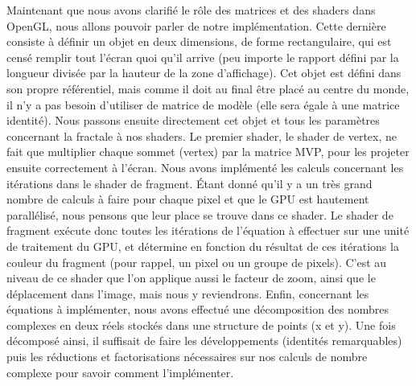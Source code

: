 \documentclass[11pt]{article}
\begin{document}
Maintenant que nous avons clarifié le rôle des matrices et des shaders dans
OpenGL, nous allons pouvoir parler de notre implémentation. Cette dernière
consiste à définir un objet en deux dimensions, de forme rectangulaire, qui est
censé remplir tout l'écran quoi qu'il arrive (peu importe le rapport défini par
la longueur divisée par la hauteur de la zone d'affichage). Cet objet est défini
dans son propre référentiel, mais comme il doit au final être placé au centre du
monde, il n'y a pas besoin d'utiliser de matrice de modèle (elle sera égale à
une matrice identité). Nous passons ensuite directement cet objet et tous les
paramètres concernant la fractale à nos shaders. Le premier shader, le shader de
vertex, ne fait que multiplier chaque sommet (vertex) par la matrice MVP, pour
les projeter ensuite correctement à l'écran. Nous avons implémenté les calculs
concernant les itérations dans le shader de fragment. Étant donné qu'il y a un
très grand nombre de calculs à faire pour chaque pixel et que le GPU est
hautement parallélisé, nous pensons que leur place se trouve dans ce shader. Le
shader de fragment exécute donc toutes les itérations de l'équation à effectuer
sur une unité de traitement du GPU, et détermine en fonction du résultat de ces
itérations la couleur du fragment (pour rappel, un pixel ou un groupe de
pixels). C'est au niveau de ce shader que l'on applique aussi le facteur de
zoom, ainsi que le déplacement dans l'image, mais nous y reviendrons. Enfin,
concernant les équations à implémenter, nous avons effectué une décomposition
des nombres complexes en deux réels stockés dans une structure de points (x et
y). Une fois décomposé ainsi, il suffisait de faire les développements
(identités remarquables) puis les réductions et factorisations nécessaires sur
nos calculs de nombre complexe pour savoir comment l'implémenter. 
\end{document}

